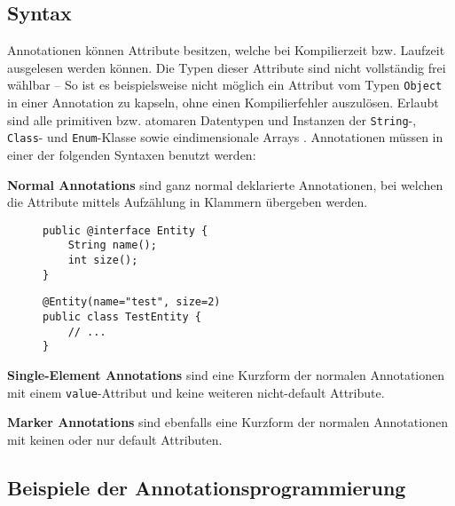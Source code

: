 \subsection{Syntax}
\label{java_annotationen_anwendung}
\noindent Annotationen können Attribute besitzen, welche bei Kompilierzeit bzw. Laufzeit ausgelesen werden können. Die Typen dieser Attribute sind nicht vollständig frei wählbar -- So ist es beispielsweise nicht möglich ein Attribut vom Typen \texttt{Object} in einer Annotation zu kapseln, ohne einen Kompilierfehler auszulösen. Erlaubt sind alle primitiven bzw. atomaren Datentypen und Instanzen der \texttt{String}-, \texttt{Class}- und \texttt{Enum}-Klasse sowie eindimensionale Arrays \cite{Gosling2005}. Annotationen müssen in einer der folgenden Syntaxen benutzt werden:
\begin{description}
	\item \textbf{Normal Annotations} sind ganz normal deklarierte Annotationen, bei welchen die Attribute mittels Aufzählung in Klammern übergeben werden.
	\begin{figure}[H]
		\noindent
		\newlength\heightone
		\begin{adjustbox}{minipage=[t]{.45\linewidth},gstore totalheight=\heightone,margin=\fboxsep+\fboxrule}
			\begin{lstlisting}[caption=Deklaration -- Normal Annotation., captionpos=b, label=lst:decl_normal]
public @interface Entity {
	String name();
	int size();
}
			\end{lstlisting}
		\end{adjustbox}\hfill
		\begin{adjustbox}{minipage=[t][\heightone]{0.5\linewidth}}
			\begin{lstlisting}[caption=Anwendung -- Normal Annotation, captionpos=b, label=lst:appl_normal]
@Entity(name="test", size=2)
public class TestEntity {
	// ...
}
			\end{lstlisting}
		\end{adjustbox}
	\end{figure}
	\item \textbf{Single-Element Annotations} sind eine Kurzform der normalen Annotationen mit einem \texttt{value}-Attribut und keine weiteren nicht-default Attribute.
	\item \textbf{Marker Annotations} sind ebenfalls eine Kurzform der normalen Annotationen mit keinen oder nur default Attributen.
\end{description}

\subsection{Beispiele der Annotationsprogrammierung}
\label{java_annotationen_annotationsprogrammierung}

